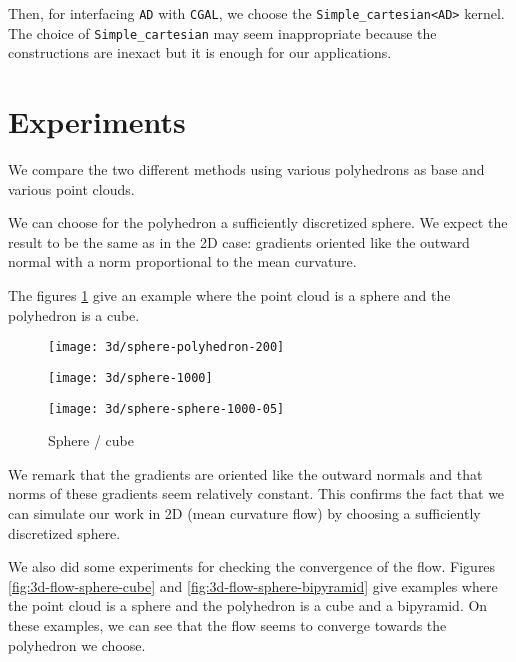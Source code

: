 Then, for interfacing \texttt{AD} with \texttt{CGAL}, we choose the
\texttt{Simple\_cartesian<AD>} kernel. The choice of \texttt{Simple\_cartesian}
may seem inappropriate because the constructions are inexact but it is enough
for our applications.


\section{Experiments}


We compare the two different methods using various polyhedrons as base and
various point clouds.

We can choose for the polyhedron a sufficiently discretized sphere. We expect
the result to be the same as in the 2D case: gradients oriented like the outward
normal with a norm proportional to the mean curvature.

The figures \ref{fig:3d-mean-curvature-sphere-cube} give an example where the
point cloud is a sphere and the polyhedron is a cube.

\begin{figure}[h]
    \centering
    \begin{minipage}{0.32\linewidth}
        \centering
        \texttt{[image: 3d/sphere-polyhedron-200]}
    \end{minipage}
    \begin{minipage}{0.32\linewidth}
        \centering
        \texttt{[image: 3d/sphere-1000]}
    \end{minipage}
    \begin{minipage}{0.32\linewidth}
        \centering
        \texttt{[image: 3d/sphere-sphere-1000-05]}
    \end{minipage}
    \caption{Sphere / cube}
    \label{fig:3d-mean-curvature-sphere-cube}
\end{figure}

We remark that the gradients are oriented like the outward normals and that
norms of these gradients seem relatively constant. This confirms the fact that
we can simulate our work in 2D (mean curvature flow) by choosing a sufficiently
discretized sphere.

We also did some experiments for checking the convergence of the flow. Figures
\ref{fig:3d-flow-sphere-cube} and \ref{fig:3d-flow-sphere-bipyramid} give
examples where the point cloud is a sphere and the polyhedron is a cube and a
bipyramid. On these examples, we can see that the flow seems to converge towards
the polyhedron we choose.

